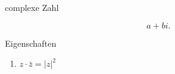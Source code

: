 \documentclass[class=article, crop=false]{standalone}
\begin{document}
\begin{zettel}{complexe Zahl}
\begin{flashcard}
    \[
        a + bi
    .\]
\end{flashcard}
\begin{remark}
    Eigenschaften
    \begin{enumerate}
        \item $z \cdot  \bar{z} =  |z|^2 $ 
        
    \end{enumerate}
    
\end{remark}
\end{zettel}
\end{document}
